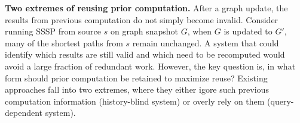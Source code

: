 



\textbf{Two extremes of reusing prior computation.} After a graph update, the results from previous computation do not 
simply become invalid.
Consider running SSSP from source $s$ on graph snapshot $G$,
when $G$ is updated to $G'$, many of the shortest paths from $s$ 
remain unchanged.
A system that could identify which results are still valid and which 
need to be recomputed would avoid a large fraction of redundant work.
However, the key question is, in what form should prior computation be retained to maximize reuse?
Existing approaches fall into two extremes, where they either igore such previous computation information (history-blind system) or overly rely on them (query-dependent system). 

